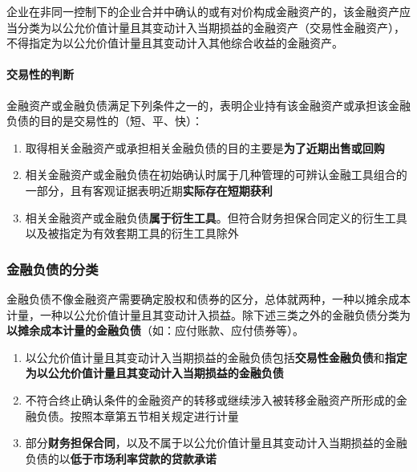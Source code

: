 \documentclass[UTF8,12pt]{ctexart}
\numberwithin{equation}{section} %
\numberwithin{figure}{section}
\numberwithin{table}{section}
\begin{document}
	企业在非同一控制下的企业合并中确认的或有对价构成金融资产的，该金融资产应当分类为以公允价值计量且其变动计入当期损益的金融资产（交易性金融资产），不得指定为以公允价值计量且其变动计入其他综合收益的金融资产。

	\paragraph{交易性的判断}
	
	金融资产或金融负债满足下列条件之一的，表明企业持有该金融资产或承担该金融负债的目的是交易性的（短、平、快）：
	\begin{enumerate}
		\item 取得相关金融资产或承担相关金融负债的目的主要是\textbf{为了近期出售或回购}
		
		\item 相关金融资产或金融负债在初始确认时属于几种管理的可辨认金融工具组合的一部分，且有客观证据表明近期\textbf{实际存在短期获利}
		
		\item 相关金融资产或金融负债\textbf{属于衍生工具}。但符合财务担保合同定义的衍生工具以及被指定为有效套期工具的衍生工具除外
	\end{enumerate}
	

	
	\subsubsection{金融负债的分类}
	
	金融负债不像金融资产需要确定股权和债券的区分，总体就两种，一种以摊余成本计量，一种以公允价值计量且其变动计入损益。除下述三类之外的金融负债分类为\textbf{以摊余成本计量的金融负债}（如：应付账款、应付债券等）。
	
	\begin{enumerate}
		\item 以公允价值计量且其变动计入当期损益的金融负债包括\textbf{交易性金融负债}和\textbf{指定为以公允价值计量且其变动计入当期损益的金融负债}
		
		\item 不符合终止确认条件的金融资产的转移或继续涉入被转移金融资产所形成的金融负债。按照本章第五节相关规定进行计量
		
		\item 部分\textbf{财务担保合同}，以及不属于以公允价值计量且其变动计入当期损益的金融负债的以\textbf{低于市场利率贷款的贷款承诺}
		
	\end{enumerate}
\end{document}

